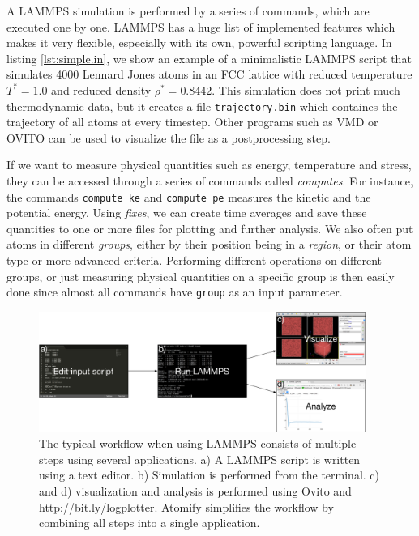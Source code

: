 \documentclass[aps,pre,twocolumn,letterpaper,floatfix,nofootinbib]{revtex4}
\newcommand{\code}[1]{\colorbox{light-gray}{\color{RawSienna}\texttt{#1}}}
\begin{document}
A LAMMPS simulation is performed by a series of commands, which are executed one by one.
LAMMPS has a huge list of implemented features which makes it very flexible, especially with its own, powerful scripting language.
In listing \ref{lst:simple.in}, we show an example of a minimalistic LAMMPS script that simulates 4000 Lennard Jones atoms in an FCC lattice with reduced temperature $T^*=1.0$ and reduced density $\rho^* = 0.8442$.
This simulation does not print much thermodynamic data, but it creates a file \code{trajectory.bin} which containes the trajectory of all atoms at every timestep.
Other programs such as VMD\citep{Humphrey1996Vmd} or OVITO\citep{Stukowski2009Visualization} can be used to visualize the file as a postprocessing step.

If we want to measure physical quantities such as energy, temperature and stress, they can be accessed through a series of commands called \textit{computes}.
For instance, the commands \code{compute ke} and \code{compute pe} measures the kinetic and the potential energy.
Using \textit{fixes}, we can create time averages and save these quantities to one or more files for plotting and further analysis.
We also often put atoms in different \textit{groups}, either by their position being in a \textit{region}, or their atom type or more advanced criteria.
Performing different operations on different groups, or just measuring physical quantities on a specific group is then easily done since almost all commands have \code{group} as an input parameter.

\begin{figure}
	\centering
	\includegraphics[width=0.95\textwidth]{flowchart.png}
	\caption{The typical workflow when using LAMMPS consists of multiple steps using several applications.
	a) A LAMMPS script is written using a text editor.
	b) Simulation is performed from the terminal.
	c) and d) visualization and analysis is performed using Ovito and \url{http://bit.ly/logplotter}.
	Atomify simplifies the workflow by combining all steps into a single application.}
	\label{fig:flowchart}
\end{figure}
\end{document}
